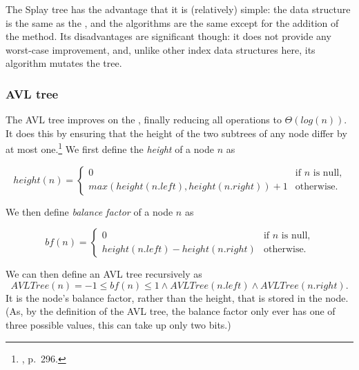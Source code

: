
The Splay tree has the advantage that it is (relatively) simple:
  the data structure is the same as the \BST,
  and the algorithms are the same except for the addition of the  method.
Its disadvantages are significant though:
  it does not provide any worst-case improvement,
  and, unlike other index data structures here,
    its  algorithm mutates the tree.


\subsubsection{AVL tree}

The AVL tree improves on the \BST,
  finally reducing all operations to $Θ(log(n))$.
It does this by ensuring that the height of the two subtrees of any node
  differ by at most one.\footnote{\cite{cormen}, p.\ 296.}
We first define the \emph{height} of a node $n$ as

\begin{equation*}
height(n) =
\begin{cases}
0                                        & \text{if $n$ is null,} \\
max(height(n.left), height(n.right)) + 1 & \text{otherwise.}
\end{cases}
\end{equation*}

We then define \emph{balance factor} of a node $n$ as

\begin{equation*}
bf(n) = \begin{cases}
0                                & \text{if $n$ is null,} \\
height(n.left) - height(n.right) & \text{otherwise.}
\end{cases}
\end{equation*}

We can then define an AVL tree recursively as
  \[AVLTree(n) = -1 ≤ bf(n) ≤ 1 ∧ AVLTree(n.left) ∧ AVLTree(n.right).\]
It is the node's balance factor,
  rather than the height,
  that is stored in the node.\footnotemark
(As, by the definition of the AVL tree,
  the balance factor only ever has one of three possible values,
  this can take up only two bits.)




